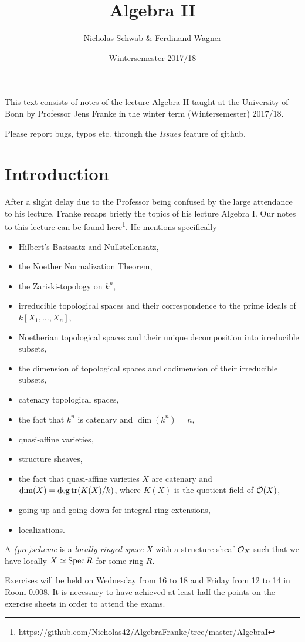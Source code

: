 \documentclass[a4paper,10pt,parskip=full,numbers=enddot]{scrreprt}
\title{Algebra II}
\author{Nicholas Schwab \& Ferdinand Wagner}
\date{Wintersemester 2017/18}
\begin{document}
\maketitle
{}
 
This text consists of notes of the lecture Algebra II taught at the University of Bonn by Professor Jens Franke in the winter term (Wintersemester) 2017/18. 

Please report bugs, typos etc. through the \emph{Issues} feature of github.

\tableofcontents

\chapter{Introduction}
After a slight delay due to the Professor being confused by the large attendance to his lecture, Franke recaps briefly the topics of his lecture Algebra I. Our notes to this lecture can be found \href{https://github.com/Nicholas42/AlgebraFranke/tree/master/AlgebraI}{here}\footnote{\url{https://github.com/Nicholas42/AlgebraFranke/tree/master/AlgebraI}}. He mentions specifically
\begin{itemize}
 \item Hilbert's Basissatz and Nullstellensatz,
 \item the Noether Normalization Theorem,
 \item the Zariski-topology on $k^n$,
 \item irreducible topological spaces and their correspondence to the prime ideals of $k[X_1, \ldots, X_n]$,
 \item Noetherian topological spaces and their unique decomposition into irreducible subsets,
 \item the dimension of topological spaces and codimension of their irreducible subsets,
 \item catenary topological spaces,
 \item the fact that $k^n$ is catenary and $\dim(k^n) = n$,
 \item quasi-affine varieties,
 \item structure sheaves,
 \item the fact that quasi-affine varieties $X$ are catenary and $\dim(X) = \deg\operatorname{tr}(K(X)/k)$, where $K(X)$ is the quotient field of $\mathcal{O}(X)$,
 \item going up and going down for integral ring extensions,
 \item localizations.
\end{itemize}
\begin{defi}[Scheme] 
    A \emph{(pre)scheme} is a \emph{locally ringed space} $X$ with a structure sheaf $\mathcal{O}_X$ such that we have locally $X\simeq \operatorname{Spec} R$ for some ring $R$.
\end{defi}

Exercises will be held on Wednesday from 16 to 18 and Friday from 12 to 14 in Room 0.008. It is necessary to have achieved at least half the points on the exercise sheets in order to attend the exams.

\end{document}
